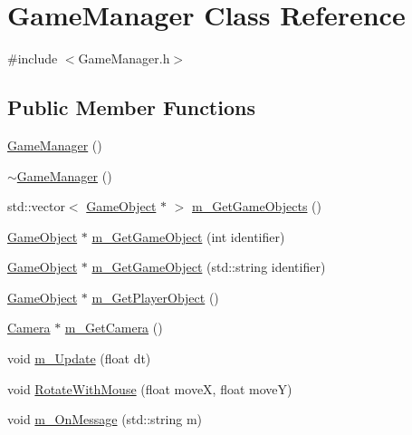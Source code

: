 \hypertarget{class_game_manager}{}\section{Game\+Manager Class Reference}
\label{class_game_manager}


{\ttfamily \#include $<$Game\+Manager.\+h$>$}

\subsection*{Public Member Functions}
\begin{DoxyCompactItemize}
\item 
\mbox{\hyperlink{class_game_manager_aa0e2424dc1a39d380e5b6605b179bf05}{Game\+Manager}} ()
\item 
\mbox{\hyperlink{class_game_manager_aaae63e38e358379c1fe507c5197a8435}{$\sim$\+Game\+Manager}} ()
\item 
std\+::vector$<$ \mbox{\hyperlink{class_game_object}{Game\+Object}} $\ast$ $>$ \mbox{\hyperlink{class_game_manager_a6b5f37f418867bd5207c6cf126113f4a}{m\+\_\+\+Get\+Game\+Objects}} ()
\item 
\mbox{\hyperlink{class_game_object}{Game\+Object}} $\ast$ \mbox{\hyperlink{class_game_manager_a979b7881772a956be7cab1d05f00044e}{m\+\_\+\+Get\+Game\+Object}} (int identifier)
\item 
\mbox{\hyperlink{class_game_object}{Game\+Object}} $\ast$ \mbox{\hyperlink{class_game_manager_ae80a0230548e9d9d5622c814b29ce55c}{m\+\_\+\+Get\+Game\+Object}} (std\+::string identifier)
\item 
\mbox{\hyperlink{class_game_object}{Game\+Object}} $\ast$ \mbox{\hyperlink{class_game_manager_a8d4801d6a53e94e2b6bea50fe8767140}{m\+\_\+\+Get\+Player\+Object}} ()
\item 
\mbox{\hyperlink{class_camera}{Camera}} $\ast$ \mbox{\hyperlink{class_game_manager_a70317e94178313c28a101430c3aeaa2a}{m\+\_\+\+Get\+Camera}} ()
\item 
void \mbox{\hyperlink{class_game_manager_ab81eadbd42345b53241d33f584ca5ac5}{m\+\_\+\+Update}} (float dt)
\item 
void \mbox{\hyperlink{class_game_manager_a53dfb2a166bbe26b9f5191973d40938e}{Rotate\+With\+Mouse}} (float moveX, float moveY)
\item 
void \mbox{\hyperlink{class_game_manager_a883605b361a964bf45c91ff6fe935b5c}{m\+\_\+\+On\+Message}} (std\+::string m)
\end{DoxyCompactItemize}



